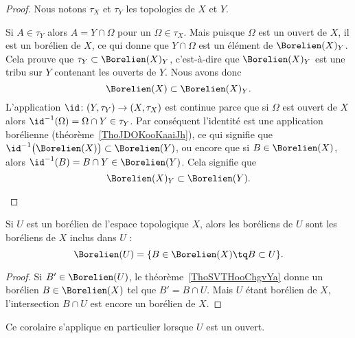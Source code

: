 \begin{proof}
	Nous notons \( \tau_X\) et \( \tau_Y\) les topologies de \( X\) et \( Y\).
	\begin{subproof}
		Si \( A\in \tau_Y\) alors \( A=Y\cap \Omega\) pour un \( \Omega\in \tau_X\). Mais puisque \(\Omega\) est un ouvert de \( X\), il est un borélien de \( X\), ce qui donne que \( Y\cap\Omega\) est un élément de \( \Borelien(X)_Y\). Cela prouve que \( \tau_Y\subset\Borelien(X)_Y\), c'est-à-dire que \( \Borelien(X)_Y\) est une tribu sur \( Y\) contenant les ouverts de \( Y\). Nous avons donc
		\begin{equation}
			\Borelien(X)\subset\Borelien(X)_Y.
		\end{equation}
		\spitem[Réciproquement]
		L'application \( \id\colon (Y,\tau_Y)\to (X,\tau_X)\) est continue parce que si \( \Omega\) est ouvert de \( X\) alors \( \id^{-1}(\Omega)=\Omega\cap Y\in \tau_Y\). Par conséquent l'identité est une application borélienne (théorème~\ref{ThoJDOKooKaaiJh}), ce qui signifie que \( \id^{-1}\big( \Borelien(X) \big)\subset\Borelien(Y)\), ou encore que si \( B\in\Borelien(X)\), alors \( \id^{-1}(B)=B\cap Y\in\Borelien(Y)\). Cela signifie que
		\begin{equation}
			\Borelien(X)_Y\subset \Borelien(Y).
		\end{equation}
	\end{subproof}
\end{proof}

\begin{corollary}       \label{CorooMJQYooFfwoTd}
	Si \( U\) est un borélien de l'espace topologique \( X\), alors les boréliens de \( U\) sont les boréliens de \( X\) inclus dans \( U\) :
	\begin{equation}
		\Borelien(U)=\{ B\in\Borelien(X)\tq B\subset U \}.
	\end{equation}
\end{corollary}

\begin{proof}
	Si \( B'\in\Borelien(U)\), le théorème~\ref{ThoSVTHooChgvYa} donne un borélien \( B\in\Borelien(X)\) tel que \( B'=B\cap U\). Mais \( U\) étant borélien de \( X\), l'intersection \( B\cap U\) est encore un borélien de \( X\).
\end{proof}
Ce corolaire s'applique en particulier lorsque \( U\) est un ouvert.

